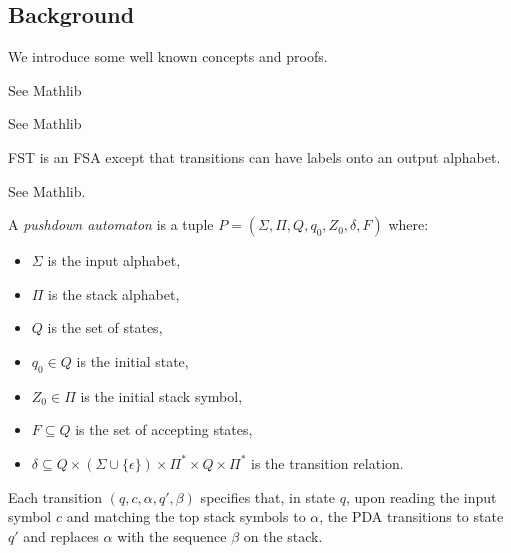 \subsection{Background}
We introduce some well known concepts and proofs.
\begin{definition}
    \label{def:FSA}
    See Mathlib
\end{definition}

\begin{definition}
    \label{def:RE}
    See Mathlib
\end{definition}

\begin{definition}
    \label{def:FST}
    FST is an FSA except that transitions can have labels onto an output alphabet.
\end{definition}

\begin{definition}
    \label{def:CFG}
    See Mathlib. 
\end{definition}


\begin{definition}
    \label{def:PDA}
    A \emph{pushdown automaton} is a tuple $P = (\Sigma, \Pi, Q, q_0, Z_0, \delta, F)$ where:
    \begin{itemize}
        \item $\Sigma$ is the input alphabet,
        \item $\Pi$ is the stack alphabet,
        \item $Q$ is the set of states,
        \item $q_0 \in Q$ is the initial state,
        \item $Z_0 \in \Pi$ is the initial stack symbol,
        \item $F \subseteq Q$ is the set of accepting states,
        \item $\delta \subseteq Q \times (\Sigma \cup \{\epsilon\}) \times \Pi^* \times Q \times \Pi^*$ is the transition relation.
    \end{itemize}

    Each transition $(q, c, \alpha, q', \beta)$ specifies that, in state $q$, upon reading the input symbol $c$ and matching the top stack symbols to $\alpha$, the PDA transitions to state $q'$ and replaces $\alpha$ with the sequence $\beta$ on the stack.
\end{definition}
